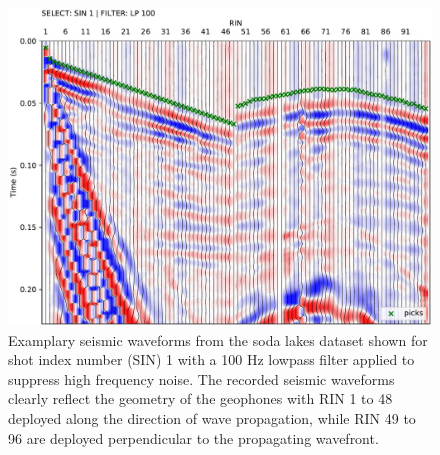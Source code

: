 \documentclass[a4paper,fleqn]{cas-sc}
\providecommand{\DIFdelend}{} %
\DeclareRobustCommand{\DIFdelend}{\DIFOaddend \let\includegraphics\DIFOincludegraphics} %
\begin{document}
\DIFdelend \begin{figure}
	\centering
	\includegraphics[width=.75\textwidth]{figures/sodalakes_sin1_lp100_picks_vd.pdf}
	\caption{Examplary seismic waveforms from the soda lakes dataset shown for shot index number (SIN) 1 with a 100 Hz lowpass filter applied to suppress high frequency noise. The recorded seismic waveforms clearly reflect the geometry of the geophones with RIN 1 to 48 deployed along the direction of wave propagation, while RIN 49 to 96 are deployed perpendicular to the propagating wavefront.}
	\label{fig:3d_pickwindow}
\end{figure}
\end{document}

